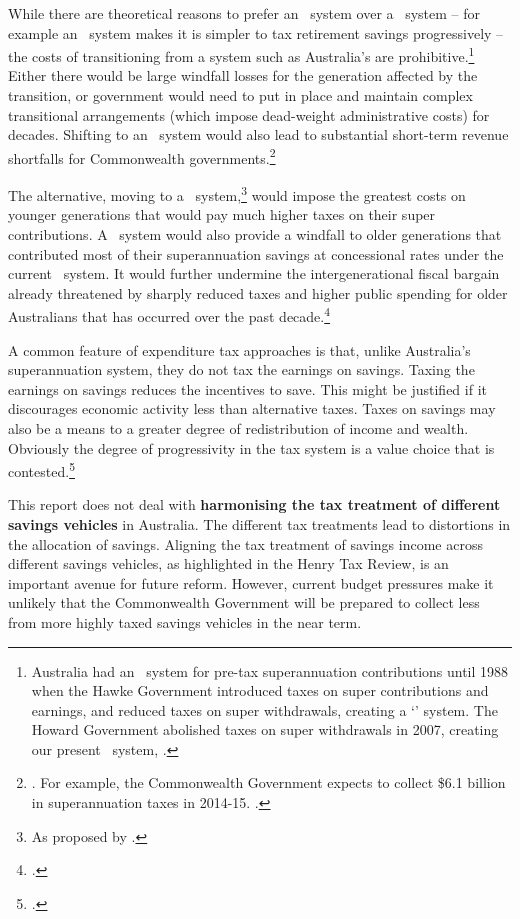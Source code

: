 While there are theoretical reasons to prefer an \EET\ system over a \TEE\ system – for example an \EET\ system makes it is simpler to tax retirement savings progressively – the costs of transitioning from a system such as Australia’s are prohibitive.\footnote{Australia had an \EET\ system for pre-tax superannuation contributions until 1988 when the Hawke Government introduced taxes on super contributions and earnings, and reduced taxes on super withdrawals, creating a `\ttt' system. The Howard Government abolished taxes on super withdrawals in 2007, creating our present \ttE\ system, \textcite[][44]{Treasury2008RetirementIncomeConsultPaper}.} Either there would be large windfall losses for the generation affected by the transition, or government would need to put in place and maintain complex transitional arrangements (which impose dead-weight administrative costs) for decades. Shifting to an \EET\ system would also lead to substantial short-term revenue shortfalls for Commonwealth governments.\footnote{\textcite{Mercer2015SubmissionToReThink}. For example, the Commonwealth Government expects to collect \$6.1 billion in superannuation taxes in 2014-15. \textcite[][5]{Treasury2015FinalBudgetOutcome1415}.}

The alternative, moving to a \TEE\ system,\footnote{As proposed by \textcites{MaddockKing2015}{Freebairn2015a}.} would impose the greatest costs on younger generations that would pay much higher taxes on their super contributions. A \TEE\ system would also provide a windfall to older generations that contributed most of their superannuation savings at concessional rates under the current \ttE\ system. It would further undermine the intergenerational fiscal bargain already threatened by sharply reduced taxes and higher public spending for older Australians that has occurred over the past decade.\footcite[][2]{DaleyWoodWeidmannEtAl2014} 

A common feature of expenditure tax approaches is that, unlike Australia’s superannuation system, they do not tax the earnings on savings. Taxing the earnings on savings reduces the incentives to save. This might be justified if it discourages economic activity less than alternative taxes. Taxes on savings may also be a means to a greater degree of redistribution of income and wealth. Obviously the degree of progressivity in the tax system is a value choice that is contested.\footcite{Davidson2015} 

This report does not deal with \textbf{harmonising the tax treatment of different savings vehicles} in Australia. The different tax treatments lead to distortions in the allocation of savings.  Aligning the tax treatment of savings income across different savings vehicles, as highlighted in the Henry Tax Review, is an important avenue for future reform. However, current budget pressures make it unlikely that the Commonwealth Government will be prepared to collect less from more highly taxed savings vehicles in the near term.

